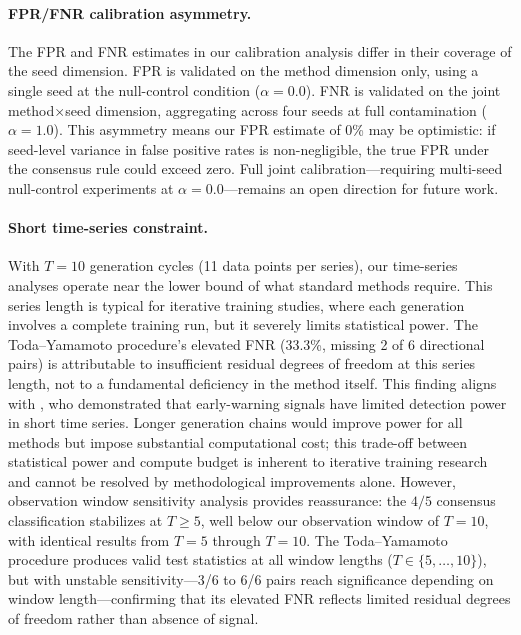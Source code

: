 \paragraph{FPR/FNR calibration asymmetry.}
The FPR and FNR estimates in our calibration analysis differ in their coverage of the seed dimension.
FPR is validated on the method dimension only, using a single seed at the null-control condition ($\alpha{=}0.0$).
FNR is validated on the joint method${\times}$seed dimension, aggregating across four seeds at full contamination ($\alpha{=}1.0$).
This asymmetry means our FPR estimate of 0\% may be optimistic: if seed-level variance in false positive rates is non-negligible, the true FPR under the consensus rule could exceed zero.
Full joint calibration---requiring multi-seed null-control experiments at $\alpha{=}0.0$---remains an open direction for future work.

\paragraph{Short time-series constraint.}
With $T{=}10$ generation cycles (11 data points per series), our time-series analyses operate near the lower bound of what standard methods require.
This series length is typical for iterative training studies, where each generation involves a complete training run, but it severely limits statistical power.
The Toda--Yamamoto procedure's elevated FNR (33.3\%, missing 2 of 6 directional pairs) is attributable to insufficient residual degrees of freedom at this series length, not to a fundamental deficiency in the method itself.
This finding aligns with \citet{boettiger2012limits}, who demonstrated that early-warning signals have limited detection power in short time series.
Longer generation chains would improve power for all methods but impose substantial computational cost; this trade-off between statistical power and compute budget is inherent to iterative training research and cannot be resolved by methodological improvements alone.
However, observation window sensitivity analysis provides reassurance: the $4/5$ consensus classification stabilizes at $T{\geq}5$, well below our observation window of $T{=}10$, with identical results from $T{=}5$ through $T{=}10$.
The Toda--Yamamoto procedure produces valid test statistics at all window lengths ($T \in \{5, \ldots, 10\}$), but with unstable sensitivity---3/6 to 6/6 pairs reach significance depending on window length---confirming that its elevated FNR reflects limited residual degrees of freedom rather than absence of signal.

